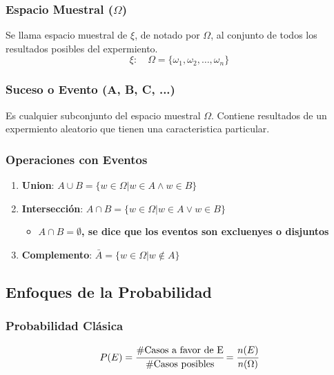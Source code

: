 \documentclass{article}
\begin{document}
        \subsubsection{\texorpdfstring{Espacio Muestral ($\Omega$)}{Espacio Muestral (Omega)}}
            Se llama espacio muestral de $\xi$, de notado por $\Omega$, al conjunto de todos los resultados posibles del expermiento.
            \[\xi:\quad\Omega =\{\omega_1, \omega_2, \dotsc,\omega_n\}\]
        \subsubsection{Suceso o Evento (A, B, C, ...)}
            Es cualquier subconjunto del espacio muestral $\Omega$. Contiene resultados de un expermiento aleatorio que tienen una caracteristica particular. 
            \subsubsection{Operaciones con Eventos}
                \begin{enumerate}
                    \item\textbf{Union}: $A\cup B = \{w\in\Omega | w\in A \land w\in B\}$
                    \item\textbf{Intersección}: $A\cap B = \{w\in\Omega | w\in A \lor w\in B\}$
                        \begin{itemize}
                            \item\textbf{$A\cap B = \emptyset$, se dice que los eventos son excluenyes o disjuntos}
                        \end{itemize}
                    \item\textbf{Complemento}: $\bar{A}=\{w\in\Omega | w\notin A\}$
                \end{enumerate}
    
    
    
    \subsection{Enfoques de la Probabilidad}
        \subsubsection{Probabilidad Clásica}
            \[P(E) = \cfrac{\#\text{Casos a favor de E}}{\#\text{Casos posibles}} = \cfrac{n(E)}{n(\Omega)}\]
        
\end{document}
